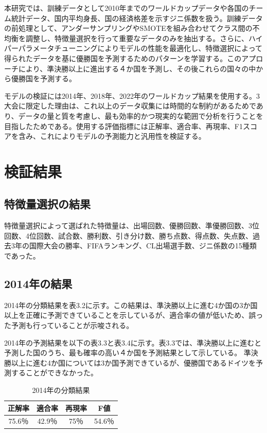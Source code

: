 \documentclass[platex]{suribt}
\begin{document}
本研究では、訓練データとして2010年までのワールドカップデータや各国のチーム統計データ、国内平均身長、国の経済格差を示すジニ係数を扱う。訓練データの前処理として、アンダーサンプリングやSMOTEを組み合わせてクラス間の不均衡を調整し、特徴量選択を行って重要なデータのみを抽出する。さらに、ハイパーパラメータチューニングによりモデルの性能を最適化し、特徴選択によって得られたデータを基に優勝国を予測するためのパターンを学習する。このアプローチにより、準決勝以上に進出する４か国を予測し、その後これらの国々の中から優勝国を予測する。

モデルの検証には2014年、2018年、2022年のワールドカップ結果を使用する。3大会に限定した理由は、これ以上のデータ収集には時間的な制約があるためであり、データの量と質を考慮し、最も効率的かつ現実的な範囲で分析を行うことを目指したためである。使用する評価指標には正解率、適合率、再現率、F1スコアを含み、これによりモデルの予測能力と汎用性を検証する。
\section{検証結果}
\subsection{特徴量選択の結果}
特徴量選択によって選ばれた特徴量は、出場回数、優勝回数、準優勝回数、3位回数、4位回数、試合数、勝利数、引き分け数、勝ち点数、得点数、失点数、過去3年の国際大会の勝率、FIFAランキング、CL出場選手数、ジニ係数の15種類であった。

\subsection{2014年の結果}

2014年の分類結果を表3.2に示す。この結果は、準決勝以上に進む4か国の3か国以上を正確に予測できていることを示しているが、適合率の値が低いため、誤った予測も行っていることが示唆される。

2014年の予測結果を以下の表3.3と表3.4に示す。表3.3では、準決勝以上に進むと予測した国のうち、最も確率の高い４か国を予測結果として示している。
準決勝以上に進む4か国については3か国予測できているが、優勝国であるドイツを予測することができなかった。

\begin{table}[h]
  \centering
  \begin{tabular}{|c|c|c|c|}
    \hline
    正解率 & 適合率 & 再現率 & F値 \\ \hline
    75.6％ & 42.9％ & 75％ & 54.6％ \\ \hline
  \end{tabular}
  \caption{2014年の分類結果}
\end{table}
\end{document}
